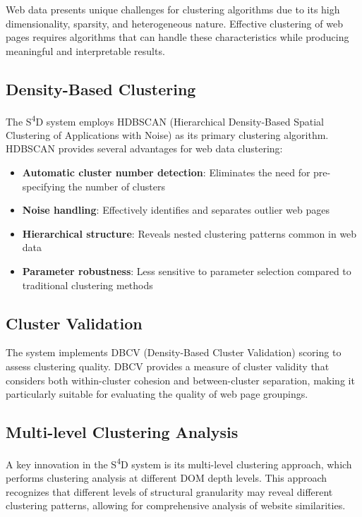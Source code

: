 Web data presents unique challenges for clustering algorithms due to its high dimensionality, sparsity, and heterogeneous nature. Effective clustering of web pages requires algorithms that can handle these characteristics while producing meaningful and interpretable results.

\subsection{Density-Based Clustering}

The S\textsuperscript{4}D system employs HDBSCAN (Hierarchical Density-Based Spatial Clustering of Applications with Noise) \cite{mcinnes2017hdbscan} as its primary clustering algorithm. HDBSCAN provides several advantages for web data clustering:

\begin{itemize}
    \item \textbf{Automatic cluster number detection}: Eliminates the need for pre-specifying the number of clusters
    \item \textbf{Noise handling}: Effectively identifies and separates outlier web pages
    \item \textbf{Hierarchical structure}: Reveals nested clustering patterns common in web data
    \item \textbf{Parameter robustness}: Less sensitive to parameter selection compared to traditional clustering methods
\end{itemize}

\subsection{Cluster Validation}

The system implements DBCV (Density-Based Cluster Validation) scoring \cite{moulavi2014dbcv} to assess clustering quality. DBCV provides a measure of cluster validity that considers both within-cluster cohesion and between-cluster separation, making it particularly suitable for evaluating the quality of web page groupings.

\subsection{Multi-level Clustering Analysis}

A key innovation in the S\textsuperscript{4}D system is its multi-level clustering approach, which performs clustering analysis at different DOM depth levels. This approach recognizes that different levels of structural granularity may reveal different clustering patterns, allowing for comprehensive analysis of website similarities.

